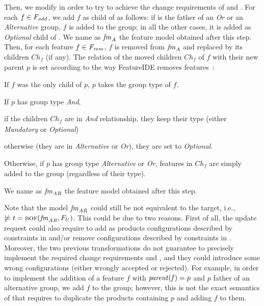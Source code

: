 \begin{tikzborder}{\cite{Gargantini16:validation}}
\begin{tikzborder}{\cite{gargantini_combinatorial_2017}}
\begin{tikzborder}{\cite{garn2019}}
\begin{tikzborder}{\cite{arcaini2019achieving}}
	Then, we modify \fmrenamed in order to try to achieve the change requirements of \Fadd and \Frem. For each $f \in \mathit{F_{add}}$, we add $f$ as child of  as follows: if  is the father of an {\it Or} or an {\it Alternative} group, $f$ is added to the group; in all the other cases, it is added as {\it Optional} child of . We name as $\mathit{fm}_{A}$ the feature model obtained after this step. Then, for each feature $f \in \mathit{F_{rem}}$, $f$ is removed from $\mathit{fm}_{A}$ and replaced by its children $\mathit{Ch_f}$ (if any). The relation of the moved children $\mathit{Ch_f}$ of $f$ with their new parent $p$ is set according to the way FeatureIDE removes features~\cite{FeatureIDEbook}:
	\begin{compactenum}
		\item If $f$ was the only child of $p$, $p$ takes the group type of $f$. 
		\item If $p$ has group type {\it And}, 
		\begin{inparaenum}
			\item if the children $\mathit{Ch_f}$ are in {\it And} relationship, they keep their type (either {\it Mandatory} or {\it Optional})
			\item otherwise (they are in {\it Alternative} or {\it Or}), they are set to {\it Optional}.
		\end{inparaenum}
		\item Otherwise, if $p$ has group type {\it Alternative} or {\it Or}, features in $\mathit{Ch_f}$ are simply added to the group (regardless of their type).
	\end{compactenum}
	
	
	We name as $\mathit{fm}_{\mathit{AR}}$ the feature model obtained after this step.
	
	Note that the model $\mathit{fm}_{\mathit{AR}}$ could still be not equivalent to the target, i.e., $\not \models t = \textsc{bof}(\mathit{fm}_{\mathit{AR}}, F_U)$. This could be due to two reasons. First of all, the update request could also require to add as products configurations described by constraints in \CFrelax and/or remove configurations described by constraints in \CFrem. Moreover, the two previous transformations do not guarantee to precisely implement the required change requirements \Fadd and \Frem, and they could introduce some wrong configurations (either wrongly accepted or rejected). For example, in order to implement the addition of a feature $f$ with $\mathit{parent(f)} = p$ and $p$ father of an alternative group, we add $f$ to the group; however, this is not the exact semantics of \Fadd that requires to duplicate the products containing $p$ and adding $f$ to them.
	\be
	

\end{tikzborder}
\end{tikzborder}
\end{tikzborder}
\end{tikzborder}
